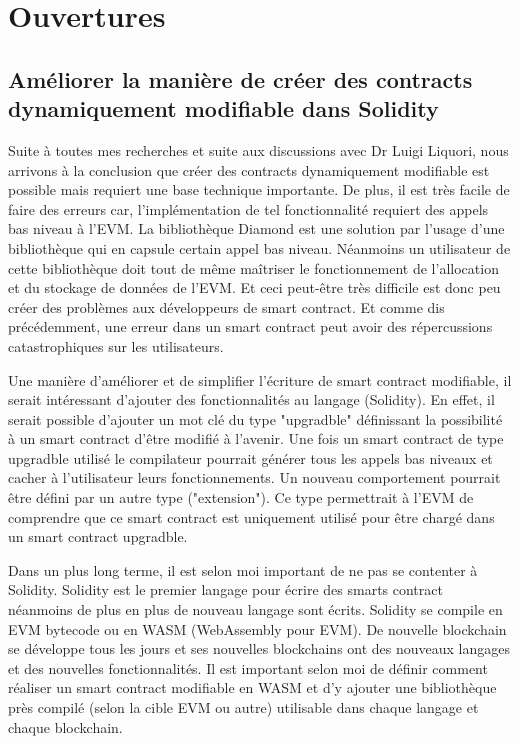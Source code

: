 \section{Ouvertures}

\subsection{Améliorer la manière de créer des contracts dynamiquement modifiable dans Solidity}
Suite à toutes mes recherches et suite aux discussions avec Dr Luigi Liquori, nous arrivons à la conclusion
que créer des contracts dynamiquement modifiable est possible mais requiert une base technique importante.
De plus, il est très facile de faire des erreurs car, l'implémentation de tel fonctionnalité requiert des appels
bas niveau à l'EVM. La bibliothèque Diamond est une solution par l'usage d'une bibliothèque qui en capsule certain
appel bas niveau. Néanmoins un utilisateur de cette bibliothèque doit tout de même maîtriser le fonctionnement 
de l'allocation et du stockage de données de l'EVM. Et ceci peut-être très difficile est donc peu créer des 
problèmes aux développeurs de smart contract. Et comme dis précédemment, une erreur dans un smart contract
peut avoir des répercussions catastrophiques sur les utilisateurs. 

Une manière d'améliorer et de simplifier  l'écriture de smart contract modifiable, il serait intéressant
d'ajouter des fonctionnalités au langage (Solidity).
En effet, il serait possible d'ajouter un mot clé du type "upgradble" définissant la possibilité à un smart contract
d'être modifié à l'avenir. Une fois un smart contract de type upgradble utilisé le compilateur pourrait générer
tous les appels bas niveaux et cacher à l'utilisateur leurs fonctionnements. Un nouveau comportement pourrait être
défini par un autre type ("extension"). Ce type permettrait à l'EVM de comprendre que ce smart contract est uniquement
utilisé pour être chargé dans un smart contract upgradble. 

Dans un plus long terme, il est selon moi important de ne pas se contenter à Solidity. Solidity est le premier langage
pour écrire des smarts contract néanmoins de plus en plus de nouveau langage sont écrits. Solidity se compile en EVM
bytecode ou en WASM (WebAssembly pour EVM). De nouvelle blockchain se développe tous les jours et ses nouvelles
blockchains ont des nouveaux langages et des nouvelles fonctionnalités. Il est important selon moi de définir comment
réaliser un smart contract modifiable en WASM et d'y ajouter une bibliothèque près compilé (selon la cible EVM ou autre)
utilisable dans chaque langage et chaque blockchain.


